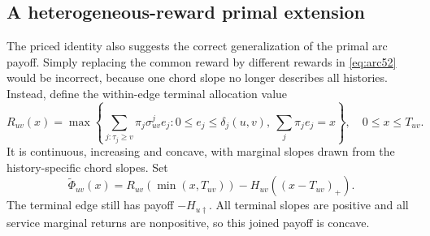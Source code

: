 \subsection{A heterogeneous-reward primal extension}\label{sec:packing54}
The priced identity also suggests the correct generalization of the primal arc payoff. Simply replacing the common reward by different rewards in \eqref{eq:arc52} would be incorrect, because one chord slope no longer describes all histories. Instead, define the within-edge terminal allocation value
\begin{equation}\label{eq:terminalprofile54}
 R_{uv}(x)=\max\left\{\sum_{j:\tau_j\geq v}\pi_j\sigma^j_{uv}e_j:
 0\leq e_j\leq\delta_j(u,v),\ \sum_j\pi_je_j=x\right\},\quad 0\leq x\leq T_{uv}.
\end{equation}
It is continuous, increasing and concave, with marginal slopes drawn from the history-specific chord slopes. Set
\begin{equation}\label{eq:heteroarc54}
 \widetilde\Phi_{uv}(x)=R_{uv}(\min(x,T_{uv}))-H_{uv}((x-T_{uv})_+).
\end{equation}
The terminal edge still has payoff $-H_{u\dagger}$. All terminal slopes are positive and all service marginal returns are nonpositive, so this joined payoff is concave.

